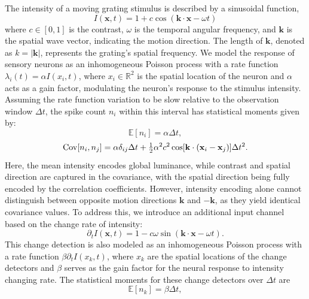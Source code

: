 The intensity of a moving grating stimulus is described by a sinusoidal function,
\begin{equation}
    I(\mathbf{x}, t) = 1 + c \cos(\mathbf{k \cdot x} - \omega t)
\end{equation}
where $c \in [0, 1]$ is the contrast, \(\omega\) is the temporal angular frequency, 
and \(\mathbf{k}\) is the spatial wave vector, indicating the motion direction. 
The length of \(\mathbf{k}\), denoted as \(k = |\mathbf{k}|\), represents the grating's spatial frequency. 
We model the response of sensory neurons as an inhomogeneous Poisson process with a rate function \(\lambda_i(t) = \alpha I(x_i, t)\), where \(x_i \in \mathbb{R}^2\) is the spatial location of the neuron and \(\alpha\) acts as a gain factor, modulating the neuron's response to the stimulus intensity.
Assuming the rate function variation to be slow relative to the observation window \(\Delta t\), the spike count $n_i$ within this interval has statistical moments given by:
\begin{equation}
    \mathbb{E}[n_i] = \alpha \Delta t,
    \label{eq:mean_n}
\end{equation}
\begin{equation}
    {\rm Cov}[n_i, n_j] =  \alpha \delta_{ij}\Delta t + \tfrac{1}{2}\alpha^2 c^2
    \cos[\mathbf{k} \cdot (\mathbf{x}_i - \mathbf{x}_j)]\Delta t^2.
    \label{eq:cov_n}
\end{equation}
Here, the mean intensity encodes global luminance, while contrast and spatial direction are captured in the covariance, with the spatial direction being fully encoded by the correlation coefficients. 
However, intensity encoding alone cannot distinguish between opposite motion directions \(\mathbf{k}\) and \(-\mathbf{k}\), as they yield identical covariance values.
To address this, we introduce an additional input channel based on the change rate of intensity:
\begin{equation}
    \partial_t I(\mathbf{x}, t) = 1 - c\omega \sin(\mathbf{k \cdot x} - \omega t).
\end{equation}
This change detection is also modeled as an inhomogeneous Poisson process with a rate function $\beta \partial_t I(x_k, t)$,
where $x_k$ are the spatial locations of the change detectors and 
$\beta$  serves as the gain factor for the neural response to intensity changing rate.
The statistical moments for these change detectors over $\Delta t$ are
\begin{equation}
    \mathbb{E}[n_k] = \beta \Delta t,
\end{equation}
